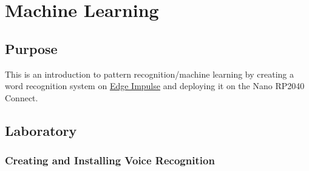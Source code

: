 \chapter{Machine Learning}

\section{Purpose}
This is an introduction to pattern recognition/machine learning by creating a 
word recognition system on \href{https://edgeimpulse.com/}{Edge Impulse} and 
deploying it on the Nano RP2040 Connect. 

\section{Laboratory}
\subsection{Creating and Installing Voice Recognition}
